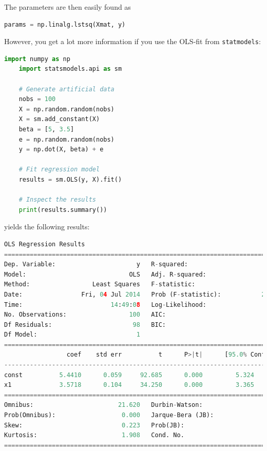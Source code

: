 The parameters are then easily found as

\begin{lstlisting}[language=Python]
    params = np.linalg.lstsq(Xmat, y)
\end{lstlisting}

However, you get a lot more information if you use the OLS-fit from \texttt{statmodels}:

\begin{lstlisting}[language=Python]
    import numpy as np
    import statsmodels.api as sm

    # Generate artificial data
    nobs = 100
    X = np.random.random(nobs)
    X = sm.add_constant(X)
    beta = [5, 3.5]
    e = np.random.random(nobs)
    y = np.dot(X, beta) + e

    # Fit regression model
    results = sm.OLS(y, X).fit()

    # Inspect the results
    print(results.summary())
\end{lstlisting}

yields the following results:

\begin{lstlisting}[language=Python]
                            OLS Regression Results
==============================================================================
Dep. Variable:                      y   R-squared:                       0.923
Model:                            OLS   Adj. R-squared:                  0.922
Method:                 Least Squares   F-statistic:                     1173.
Date:                Fri, 04 Jul 2014   Prob (F-statistic):           2.45e-56
Time:                        14:49:08   Log-Likelihood:                -15.390
No. Observations:                 100   AIC:                             34.78
Df Residuals:                      98   BIC:                             39.99
Df Model:                           1
==============================================================================
                 coef    std err          t      P>|t|      [95.0% Conf. Int.]
------------------------------------------------------------------------------
const          5.4410      0.059     92.685      0.000         5.324     5.557
x1             3.5718      0.104     34.250      0.000         3.365     3.779
==============================================================================
Omnibus:                       21.620   Durbin-Watson:                   2.302
Prob(Omnibus):                  0.000   Jarque-Bera (JB):                5.798
Skew:                           0.223   Prob(JB):                       0.0551
Kurtosis:                       1.908   Cond. No.                         4.60
==============================================================================
\end{lstlisting}

